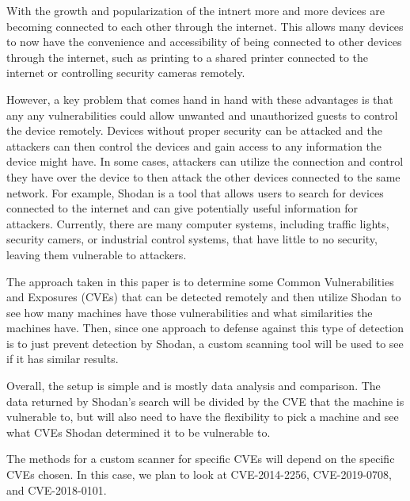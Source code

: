 With the growth and popularization of the intnert more and more devices
are becoming connected to each other through the internet. This allows many
devices to now have the convenience and accessibility of being connected
to other devices through the internet, such as printing to a
shared printer connected to the internet or controlling security cameras
remotely.

However, a key problem that comes hand in hand with these advantages is that
any any vulnerabilities could allow unwanted and unauthorized guests to
control the device remotely. Devices without proper security can be attacked
and the attackers can then control the devices and gain access to any
information the device might have. In some cases, attackers can utilize the
connection and control they have over the device to then attack the other
devices connected to the same network. For example, Shodan is a tool that
allows users to search for devices connected to the internet and can give
potentially useful information for attackers. Currently, there are many
computer systems, including traffic lights, security camers, or industrial
control systems, that have little to no security, leaving them vulnerable to
attackers\cite{afit//CSAR-10-025-01}.

The approach taken in this paper is to determine some Common Vulnerabilities
and Exposures (CVEs) that can be detected remotely and then utilize Shodan
to see how many machines have those vulnerabilities and what similarities
the machines have. Then, since one approach to defense against this type of
detection is to just prevent detection by Shodan, a custom scanning tool
will be used to see if it has similar results.

Overall, the setup is simple and is mostly data analysis and comparison.
The data returned by Shodan's search will be divided by the CVE that the
machine is vulnerable to, but will also need to have the flexibility to
pick a machine and see what CVEs Shodan determined it to be vulnerable to.

The methods for a custom scanner for specific CVEs will depend on the
specific CVEs chosen. In this case, we plan to look at CVE-2014-2256,
CVE-2019-0708, and CVE-2018-0101.

